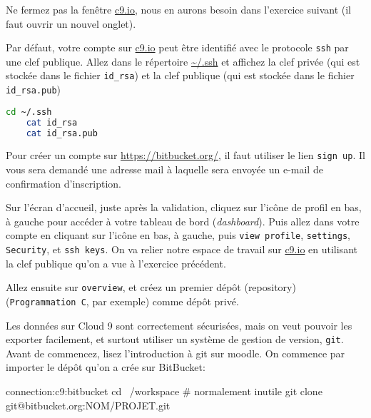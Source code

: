 \begin{fminipage}{0.9\textwidth}
  Ne fermez pas la fenêtre \url{c9.io}, nous en aurons besoin dans
  l'exercice suivant (il faut ouvrir un nouvel onglet).
\end{fminipage}

\question Par défaut, votre compte sur \url{c9.io} peut être identifié
avec le protocole \texttt{ssh} par une clef publique. Allez dans le répertoire \url{~/.ssh} et affichez la clef privée (qui est stockée dans le fichier \texttt{id\_rsa}) et la clef publique (qui est stockée dans le fichier \texttt{id\_rsa.pub})


\begin{solution}
  \begin{lstlisting}[language=bash]
    cd ~/.ssh
    cat id_rsa
    cat id_rsa.pub
  \end{lstlisting}
\end{solution}


Pour créer un compte sur \url{https://bitbucket.org/}, il faut
utiliser le lien \texttt{sign up}. Il vous sera demandé une adresse
mail à laquelle sera envoyée un e-mail de confirmation d'inscription.


\question Sur l'écran d'accueil, juste après la validation, cliquez
sur l'icône de profil en bas, à gauche pour accéder à votre tableau de
bord (\emph{dashboard}). Puis allez dans votre compte en cliquant sur
l'icône en bas, à gauche, puis \texttt{view profile},
\texttt{settings}, \texttt{Security}, et \texttt{ssh keys}. On va
relier notre espace de travail sur \url{c9.io} en utilisant la clef
publique qu'on a vue à l'exercice précédent.

\question Allez ensuite sur \texttt{overview}, et créez un premier
dépôt (repository) (\texttt{Programmation C}, par exemple) comme dépôt
privé. 


Les données sur Cloud 9 sont correctement sécurisées, mais on veut
pouvoir les exporter facilement, et surtout utiliser un système de
gestion de version, \texttt{git}. Avant de commencez, lisez
l'introduction à git sur moodle. On commence par importer le dépôt
qu'on a crée sur BitBucket:

\begin{solution}
  \begin{bash}{connection:c9:bitbucket}
    cd ~/workspace # normalement inutile
    git clone git@bitbucket.org:NOM/PROJET.git
  \end{bash}
\end{solution}




